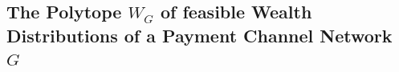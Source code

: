 \documentclass[10pt,twocolumn]{article}
\newtheorem{definition}{Definition}[section]
\newtheorem{lemma}[theorem]{Lemma}
\begin{document}
\subsection{The Polytope $W_G$ of feasible Wealth Distributions of a Payment Channel Network $G$}



\end{document}

